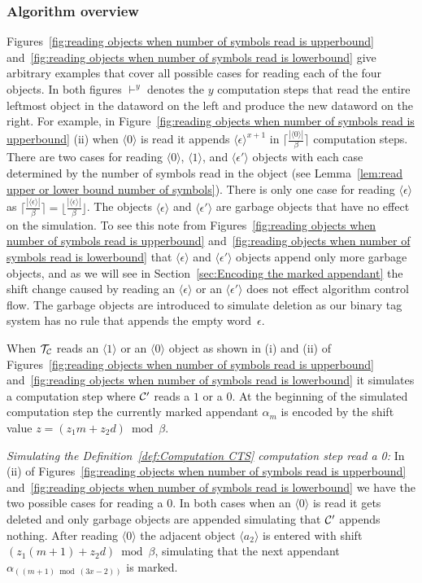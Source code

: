 \documentclass[11pt]{article} \usepackage{amsfonts,amsmath,amssymb,amsthm}
\newcommand{\tne}[1]{\ensuremath{\langle #1\rangle}}
\newcommand{\encodeOne}{\tne{1}}
\newcommand{\encodeZero}{\tne{0}}
\newcommand{\encodeDeletion}{\tne{\epsilon}}
\newcommand{\encodeDeletionPrime}{\tne{\epsilon'}}
\begin{document}
\subsubsection{Algorithm overview}\label{sec:Algorithm overview}
Figures~\ref{fig:reading objects when number of symbols read is upperbound} and~\ref{fig:reading objects when number of symbols read is lowerbound} give arbitrary examples that cover all possible cases for reading each of the four objects. 
In both figures $\vdash^y$ denotes the $y$ computation steps that read the entire leftmost object in the dataword on the left and produce the new dataword on the right. 
For example, in Figure~\ref{fig:reading objects when number of symbols read is upperbound} (ii) when $\encodeZero$ is read it appends $\encodeDeletion^{x+1}$ in $\lceil\frac{|\encodeZero|}{\beta}\rceil$ computation steps.
There are two cases for reading $\encodeZero$, $\encodeOne$, and $\encodeDeletionPrime$ objects with each case determined by the number of symbols read in the object (see Lemma~\ref{lem:read upper or lower bound number of symbols}). 
There is only one case for reading $\encodeDeletion$ as $\lceil\frac{|\encodeDeletion|}{\beta}\rceil=\lfloor\frac{|\encodeDeletion|}{\beta}\rfloor$. 
The objects $\encodeDeletion$ and $\encodeDeletionPrime$ are garbage objects that have no effect on the simulation.
To see this note from Figures~\ref{fig:reading objects when number of symbols read is upperbound} and~\ref{fig:reading objects when number of symbols read is lowerbound} that $\encodeDeletion$ and $\encodeDeletionPrime$ objects append only more garbage objects, and as we will see in Section~\ref{sec:Encoding the marked appendant} the shift change caused by reading an $\encodeDeletion$ or an $\encodeDeletionPrime$ does not effect algorithm control flow.
The garbage objects are introduced to simulate deletion as our binary tag system has no rule that appends the empty word~$\epsilon$.

When $\mathcal{T_{\mathcal{C}}}$ reads an $\encodeOne$ or an $\encodeZero$ object as shown in (i) and (ii) of Figures~\ref{fig:reading objects when number of symbols read is upperbound} and~\ref{fig:reading objects when number of symbols read is lowerbound} it simulates a computation step where $\mathcal{C'}$ reads a $1$ or a $0$.
At the beginning of the simulated computation step the currently marked appendant $\alpha_m$ is encoded by the shift value $z=(z_1m+z_2d)\bmod\beta$. 

\emph{Simulating the Definition~\ref{def:Computation CTS} computation step read a 0:} In (ii) of Figures~\ref{fig:reading objects when number of symbols read is upperbound} and~\ref{fig:reading objects when number of symbols read is lowerbound} we have the two possible cases for reading a $0$. In both cases when an $\encodeZero$ is read it gets deleted and only garbage objects are appended simulating that $\mathcal{C'}$ appends nothing. After reading $\encodeZero$ the adjacent object $\tne{a_2}$ is entered with shift $(z_1(m+1)+z_2d)\bmod\beta$, simulating that the next appendant $\alpha_{((m+1)\bmod (3x-2))}$ is marked.
\end{document}
